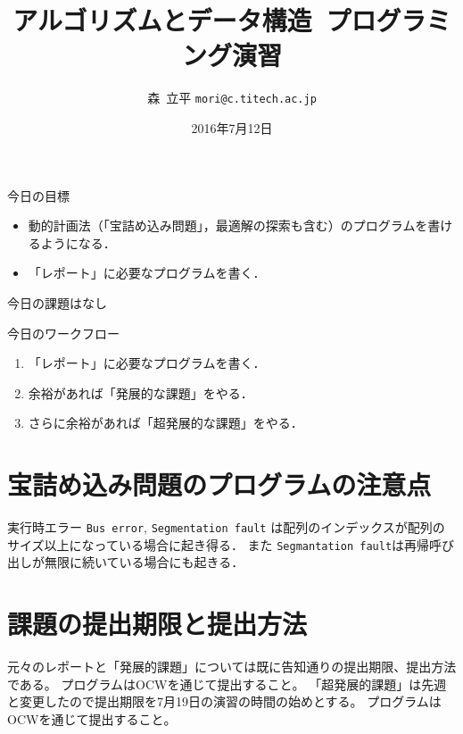 \documentclass[a4paper,twoside,onecolumn,openany,article]{memoir}
\title{アルゴリズムとデータ構造~プログラミング演習}
\date{2016年7月12日}
\author{森~立平 \texttt{mori@c.titech.ac.jp}}
\theoremstyle{remark}
\begin{document}
\maketitle

\noindent
今日の目標
\begin{itemize}
\item 動的計画法（「宝詰め込み問題」，最適解の探索も含む）のプログラムを書けるようになる．
\item 「レポート」に必要なプログラムを書く．
\end{itemize}

\noindent
今日の課題はなし

\vspace{.5em}
\noindent
今日のワークフロー
\begin{enumerate}
\item 「レポート」に必要なプログラムを書く．
\item 余裕があれば「発展的な課題」をやる．
\item さらに余裕があれば「超発展的な課題」をやる．
\end{enumerate}

\section{宝詰め込み問題のプログラムの注意点}
実行時エラー \texttt{Bus error}, \texttt{Segmentation fault} は配列のインデックスが配列のサイズ以上になっている場合に起き得る．
また \texttt{Segmantation fault}は再帰呼び出しが無限に続いている場合にも起きる．



\section{課題の提出期限と提出方法}
元々のレポートと「発展的課題」については既に告知通りの提出期限、提出方法である。
プログラムはOCWを通じて提出すること。
「超発展的課題」は先週と変更したので提出期限を7月19日の演習の時間の始めとする。
プログラムはOCWを通じて提出すること。
\end{document}
